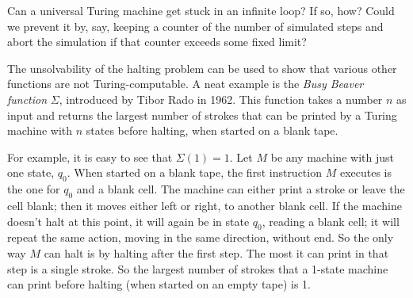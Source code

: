 



\begin{exercise}
  Can a universal Turing machine get stuck in an infinite loop?
  If so, how?
  Could we prevent it by, say,
  keeping a counter of the number of simulated steps and abort the simulation if that counter exceeds some fixed limit?
\end{exercise}

The unsolvability of the halting problem
can be used to show that
various other functions are not Turing-computable.
A neat example is the \emph{Busy Beaver function} $\Sigma$,
introduced by Tibor Rado in 1962.
This function takes a number $n$ as input
and returns the largest number of strokes that can be printed by a Turing machine with $n$ states before halting,
when started on a blank tape.

For example,
it is easy to see that
$\Sigma(1) = 1$.
Let $M$ be any machine with just one state, $q_0$.
When started on a blank tape,
the first instruction $M$ executes is the one for $q_0$ and a blank cell.
The machine can either print a stroke or leave the cell blank;
then it moves either left or right,
to another blank cell.
If the machine doesn't halt at this point,
it will again be in state $q_0$, reading a blank cell;
it will repeat the same action,
moving in the same direction,
without end.
So the only way $M$ can halt is by halting after the first step.
The most it can print in that step is a single stroke.
So the largest number of strokes that a 1-state machine can print before halting
(when started on an empty tape) is 1.

